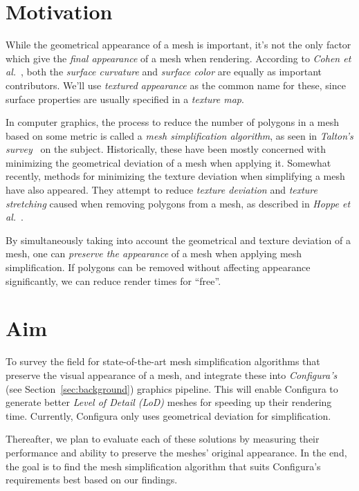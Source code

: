 \section{Motivation}
\label{sec:motivation}

While the geometrical appearance of a mesh is important, it's not the only factor which give the \emph{final appearance} of a mesh when rendering. According to \emph{Cohen et al.}~\cite{cohen1998appearance}, both the \emph{surface curvature} and \emph{surface color} are equally as important contributors. We'll use \emph{textured appearance} as the common name for these, since surface properties are usually specified in a \emph{texture map}.

In computer graphics, the process to reduce the number of polygons in a mesh based on some metric is called a \emph{mesh simplification algorithm}, as seen in \emph{Talton's survey}~\cite{talton2004short} on the subject. Historically, these have been mostly concerned with minimizing the geometrical deviation of a mesh when applying it. Somewhat recently, methods for minimizing the texture deviation when simplifying a mesh have also appeared. They attempt to reduce \emph{texture deviation} and \emph{texture stretching} caused when removing polygons from a mesh, as described in \emph{Hoppe et al.}~\cite{hoppe1996progressive}.

By simultaneously taking into account the geometrical and texture deviation of a mesh, one can \emph{preserve the appearance} of a mesh when applying mesh simplification. If polygons can be removed without affecting appearance significantly, we can reduce render times for ``free''.

\section{Aim}
\label{sec:aim}

To survey the field for state-of-the-art mesh simplification algorithms that preserve the visual appearance of a mesh, and integrate these into \emph{Configura's} (see Section~\ref{sec:background}) graphics pipeline. This will enable Configura to generate better \emph{Level of Detail (LoD)} meshes for speeding up their rendering time. Currently, Configura only uses geometrical deviation for simplification.

Thereafter, we plan to evaluate each of these solutions by measuring their performance and ability to preserve the meshes' original appearance. In the end, the goal is to find the mesh simplification algorithm that suits Configura's requirements best based on our findings.

